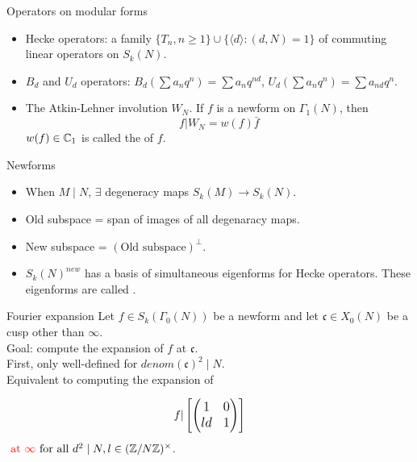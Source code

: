 \documentclass[handout]{beamer}
\newcommand{\fc}{\mathfrak{c}}
\begin{document}
\begin{frame}{Operators on modular forms}

\begin{itemize}
\item Hecke operators: a family $\{T_n, n \geq 1 \} \cup \{ \langle d \rangle: (d,N) = 1\}$ of commuting linear operators on $S_k(N)$. 

\item $B_d$ and $U_d$ operators: $B_d(\sum a_n q^n) = \sum a_{n} q^{nd}$, $U_d(\sum a_n q^n) = \sum a_{nd} q^{n}$.

\item The Atkin-Lehner involution $W_N$.  If $f$ is a newform on $\Gamma_1(N)$, then 
\[
	f | W_N = w(f) \bar{f}
\]
$w(f) \in \mathbb{C}_1$ is called the  of $f$. 

\end{itemize}

\end{frame}

\begin{frame}{Newforms}

\begin{itemize}
\item When $M \mid N$, $\exists$ degeneracy maps $S_k(M) \to S_k(N)$. 
\item Old subspace = span of images of all degenaracy maps. 
\item New subspace = $(\mbox{Old subspace})^{\perp}$.
\item $S_k(N)^{new}$ has a basis of simultaneous eigenforms for   Hecke operators. These eigenforms 
are called .
\end{itemize}

\end{frame}



\begin{frame}{Fourier expansion}
Let $f \in S_k(\Gamma_0(N))$ be a newform and let $\fc \in X_0(N)$ be a cusp other than $\infty$.  \\

Goal: compute the expansion of $f$ at $\fc$. \\ 

First, only well-defined for $denom(\fc)^2 \mid N$. \\ 

Equivalent to computing the expansion of 

$$\large{f | \left[\left( \begin{matrix}1&0\\ld&1 \end{matrix}\right)\right]}$$ 
$\textcolor{red}{\mbox{ at } \infty} \mbox{ for all } d^2 \mid N, l \in (\mathbb{Z}/N\mathbb{Z})^{\times}$.

\end{frame}
\end{document}
